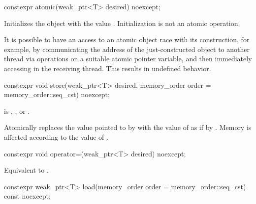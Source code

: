 %
\begin{itemdecl}
constexpr atomic(weak_ptr<T> desired) noexcept;
\end{itemdecl}

\begin{itemdescr}
\pnum
\effects
Initializes the object with the value .
Initialization is not an atomic operation.
\begin{note}
It is possible to have an access to
an atomic object  race with its construction,
for example,
by communicating the address of the just-constructed object 
to another thread via  operations
on a suitable atomic pointer variable, and
then immediately accessing  in the receiving thread.
This results in undefined behavior.
\end{note}
\end{itemdescr}

%
\begin{itemdecl}
constexpr void store(weak_ptr<T> desired, memory_order order = memory_order::seq_cst) noexcept;
\end{itemdecl}

\begin{itemdescr}
\pnum
\expects
{} is
,
, or
.

\pnum
\effects
Atomically replaces the value pointed to by  with
the value of  as if by .
Memory is affected according to the value of .
\end{itemdescr}

%
\begin{itemdecl}
constexpr void operator=(weak_ptr<T> desired) noexcept;
\end{itemdecl}

\begin{itemdescr}
\pnum
\effects
Equivalent to .
\end{itemdescr}

%
\begin{itemdecl}
constexpr weak_ptr<T> load(memory_order order = memory_order::seq_cst) const noexcept;
\end{itemdecl}

